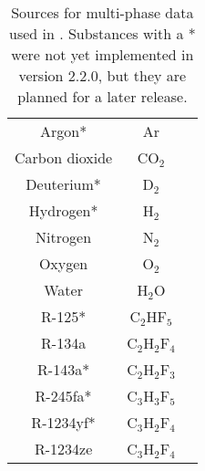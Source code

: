 \begin{table}
\centering
\caption{Sources for multi-phase data used in \PM.  Substances with a * were not yet implemented in version 2.2.0, but they are planned for a later release.}\label{tab:mp:source}
\begin{tabular}{|ccc|}
\hline
Argon* & Ar & \cite{tegeler:1999}\\
Carbon dioxide & CO$_2$ & \cite{span:1994}\\
Deuterium* & D$_2$ & \cite{richardson:2013}\\
Hydrogen* & H$_2$ & \cite{leachman:2009}\\
Nitrogen & N$_2$ & \cite{span:2000}\\
Oxygen & O$_2$ & \cite{setzmann:1991}\\
Water & H$_2$O & \cite{iapws:2014}\\
R-125* & C$_2$HF$_5$ & \cite{piao:1998}\\
R-134a & C$_2$H$_2$F$_4$ & \cite{tilner:1994}\\
R-143a* & C$_2$H$_2$F$_3$ & \cite{lemmon:2000}\\
R-245fa* & C$_3$H$_3$F$_5$ & \cite{akasaka:2015}\\
R-1234yf* & C$_3$H$_2$F$_4$ & \cite{richter:2011}\\
R-1234ze & C$_3$H$_2$F$_4$ & \cite{thol:2016}\\
\hline
\end{tabular}
\end{table}
